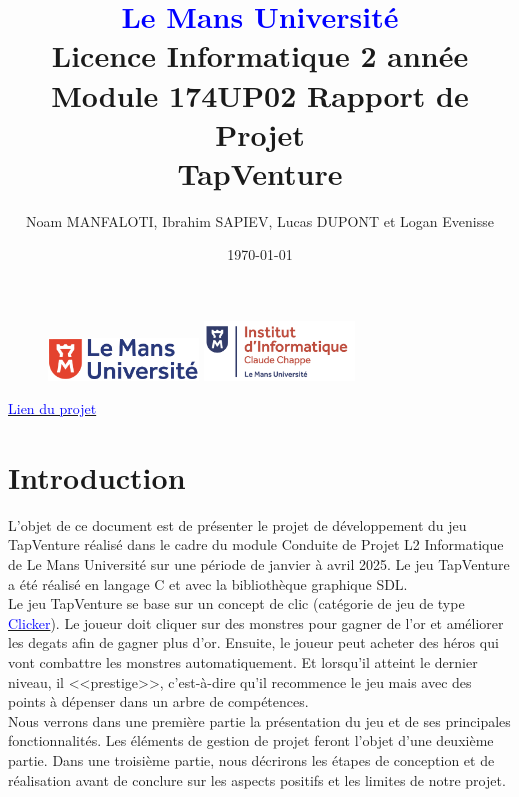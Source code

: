 \documentclass[11pt,a4paper]{article}
\begin{document}
    

\begin{figure}[t]
    \includegraphics[width=4cm]{img/logolemansU.png}\hfill
    \includegraphics[width=4cm]{img/logo_IC2.png}\\
\end{figure}
\title{\textcolor{blue}{\textbf{Le Mans Université}}\\
Licence Informatique 2 année\\
Module 174UP02 Rapport de Projet\\
\textbf{TapVenture}}
\author{Noam MANFALOTI, Ibrahim SAPIEV, Lucas DUPONT et Logan Evenisse}
\date{\today}
\maketitle
\begin{center}
    \href{https://github.com/nmanfaloti/TapVenture}{\textcolor{blue}{Lien du projet}}
\end{center}
\newpage
\tableofcontents
\newpage

\section{Introduction}
L'objet de ce document est de présenter le projet de développement du jeu TapVenture réalisé dans le cadre du module Conduite de Projet L2 Informatique de Le Mans Université sur une 
période de janvier à avril 2025. Le jeu TapVenture a été réalisé en langage C et avec la bibliothèque graphique SDL.\\
Le jeu TapVenture se base sur un concept de clic (catégorie de jeu de type \href{https://en.wikipedia.org/wiki/Incremental_game}{\textcolor{blue}{Clicker}}). 
Le joueur doit cliquer sur des monstres pour gagner de l'\gls{or} et améliorer les \gls{degats} afin de gagner plus d'or. Ensuite, le joueur peut acheter des héros qui vont 
combattre les monstres automatiquement. Et lorsqu'il atteint le dernier niveau, il <<prestige>>, c'est-à-dire qu'il recommence le jeu mais avec des points à 
dépenser dans un arbre de compétences.\\
Nous verrons dans une première partie la présentation du jeu et de ses principales fonctionnalités. Les éléments de gestion de projet feront l'objet d'une deuxième partie. 
Dans une troisième partie, nous décrirons les étapes de conception et de réalisation avant de conclure sur les aspects positifs et les limites de notre projet.
\\
\end{document}
